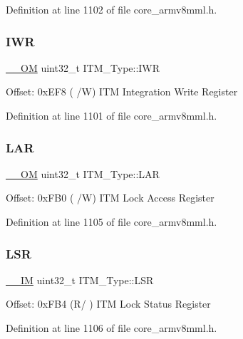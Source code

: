 Definition at line 1102 of file core\+\_\+armv8mml.\+h.

\mbox{\label{struct_i_t_m___type_aa9da04891e48d1a2f054de186e9c4c94}} 
\subsubsection{\texorpdfstring{I\+WR}{IWR}}
{\footnotesize\ttfamily \hyperlink{core__sc300_8h_a0ea2009ed8fd9ef35b48708280fdb758}{\+\_\+\+\_\+\+OM} uint32\+\_\+t I\+T\+M\+\_\+\+Type\+::\+I\+WR}

Offset\+: 0x\+E\+F8 ( /W) I\+TM Integration Write Register 

Definition at line 1101 of file core\+\_\+armv8mml.\+h.

\mbox{\label{struct_i_t_m___type_a7f9c2a2113a11c7f3e98915f95b669d5}} 
\subsubsection{\texorpdfstring{L\+AR}{LAR}}
{\footnotesize\ttfamily \hyperlink{core__sc300_8h_a0ea2009ed8fd9ef35b48708280fdb758}{\+\_\+\+\_\+\+OM} uint32\+\_\+t I\+T\+M\+\_\+\+Type\+::\+L\+AR}

Offset\+: 0x\+F\+B0 ( /W) I\+TM Lock Access Register 

Definition at line 1105 of file core\+\_\+armv8mml.\+h.

\mbox{\label{struct_i_t_m___type_a3861c67933a24dd6632288c4ed0b80c8}} 
\subsubsection{\texorpdfstring{L\+SR}{LSR}}
{\footnotesize\ttfamily \hyperlink{core__sc300_8h_a4cc1649793116d7c2d8afce7a4ffce43}{\+\_\+\+\_\+\+IM} uint32\+\_\+t I\+T\+M\+\_\+\+Type\+::\+L\+SR}

Offset\+: 0x\+F\+B4 (R/ ) I\+TM Lock Status Register 

Definition at line 1106 of file core\+\_\+armv8mml.\+h.

